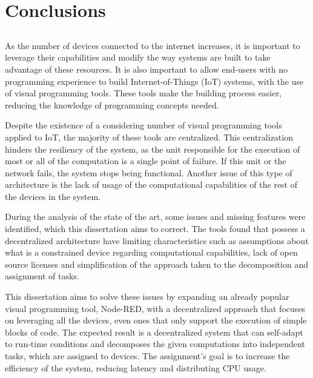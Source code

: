 \chapter{Conclusions} \label{chap:concl}

\section*{}


As the number of devices connected to the internet increases, it is important to leverage their capabilities and modify the way systems are built to take advantage of these resources. It is also important to allow end-users with no programming experience to build Internet-of-Things (IoT) systems, with the use of visual programming tools. These tools make the building process easier, reducing the knowledge of programming concepts needed.

Despite the existence of a considering number of visual programming tools applied to IoT, the majority of these tools are centralized. This centralization hinders the resiliency of the system, as the unit responsible for the execution of most or all of the computation is a single point of failure. If this unit or the network fails, the system stops being functional. Another issue of this type of architecture is the lack of usage of the computational capabilities of the rest of the devices in the system.

During the analysis of the state of the art, some issues and missing features were identified, which this dissertation aims to correct. The tools found that possess a decentralized architecture have limiting characteristics such as assumptions about what is a constrained device regarding computational capabilities, lack of open source licenses and simplification of the approach taken to the decomposition and assignment of tasks.

This dissertation aims to solve these issues by expanding an already popular visual programming tool, Node-RED, with a decentralized approach that focuses on leveraging all the devices, even ones that only support the execution of simple blocks of code. The expected result is a decentralized system that can self-adapt to run-time conditions and decomposes the given computations into independent tasks, which are assigned to devices. The assignment's goal is to increase the efficiency of the system, reducing latency and distributing CPU usage.  


